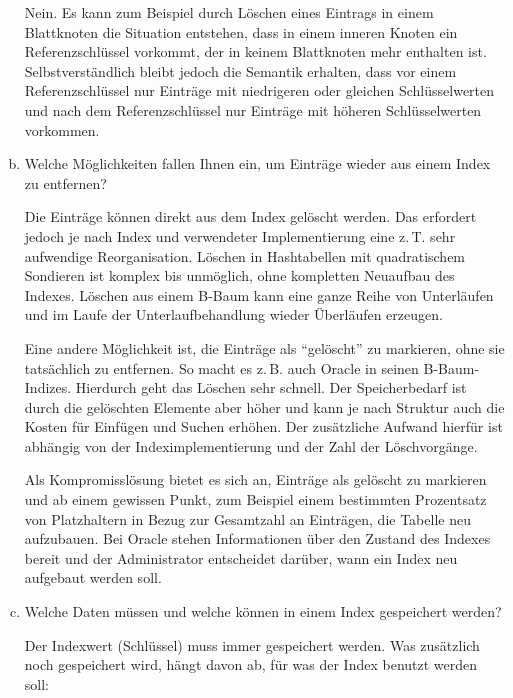 \begin{enumerate}[a)]
	\begin{solution}
		Nein. Es kann zum Beispiel durch Löschen eines Eintrags in einem Blattknoten die Situation entstehen,
		dass in einem inneren Knoten ein Referenzschlüssel vorkommt, der in keinem Blattknoten mehr enthalten ist. \\
		Selbstverständlich bleibt jedoch die Semantik erhalten, dass vor einem Referenzschlüssel nur Einträge mit niedrigeren
		oder gleichen Schlüsselwerten und nach dem Referenzschlüssel nur Einträge mit höheren Schlüsselwerten vorkommen.
	\end{solution}

	\item Welche Möglichkeiten fallen Ihnen ein, um Einträge wieder aus einem Index zu entfernen?

	\begin{solution}
		Die Einträge können direkt aus dem Index gelöscht werden. Das erfordert jedoch je nach Index und verwendeter Implementierung eine z.\,T. sehr aufwendige Reorganisation. Löschen in Hashtabellen mit quadratischem Sondieren ist komplex bis unmöglich, ohne kompletten Neuaufbau des Indexes. Löschen aus einem B-Baum kann eine ganze Reihe von Unterläufen und im Laufe der Unterlaufbehandlung wieder Überläufen erzeugen.

		Eine andere Möglichkeit ist, die Einträge als "`gelöscht"' zu markieren, ohne sie tatsächlich zu entfernen. So macht es z.\,B. auch Oracle in seinen B-Baum-Indizes. Hierdurch geht das Löschen sehr schnell. Der Speicherbedarf ist durch die gelöschten Elemente aber höher und kann je nach Struktur auch die Kosten für Einfügen und Suchen erhöhen. Der zusätzliche Aufwand hierfür ist abhängig von der Indeximplementierung und der Zahl der Löschvorgänge.

		Als Kompromisslösung bietet es sich an, Einträge als gelöscht zu markieren und ab einem gewissen Punkt, zum Beispiel einem bestimmten Prozentsatz von Platzhaltern in Bezug zur Gesamtzahl an Einträgen, die Tabelle neu aufzubauen. Bei Oracle stehen Informationen über den Zustand des Indexes bereit und der Administrator entscheidet darüber, wann ein Index neu aufgebaut werden soll.
	\end{solution}

	\item Welche Daten müssen und welche können in einem Index gespeichert werden?

	\begin{solution}
		Der Indexwert (Schlüssel) muss immer gespeichert werden. Was zusätzlich noch gespeichert wird, hängt davon ab, für was der Index benutzt werden soll:


\end{solution}
\end{enumerate}
